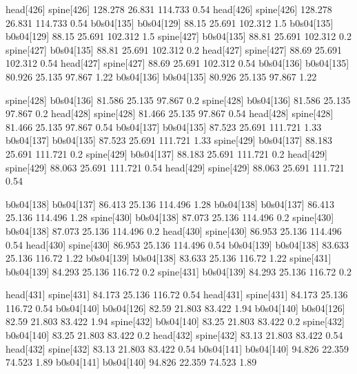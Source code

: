 head[426]    spine[426]    128.278    26.831    114.733    0.54
head[426]    spine[426]    128.278    26.831    114.733    0.54
b0s04[135]    b0s04[129]    88.15    25.691    102.312    1.5
b0s04[135]    b0s04[129]    88.15    25.691    102.312    1.5
spine[427]    b0s04[135]    88.81    25.691    102.312    0.2
spine[427]    b0s04[135]    88.81    25.691    102.312    0.2
head[427]    spine[427]    88.69    25.691    102.312    0.54
head[427]    spine[427]    88.69    25.691    102.312    0.54
b0s04[136]    b0s04[135]    80.926    25.135    97.867    1.22
b0s04[136]    b0s04[135]    80.926    25.135    97.867    1.22


spine[428]    b0s04[136]    81.586    25.135    97.867    0.2
spine[428]    b0s04[136]    81.586    25.135    97.867    0.2
head[428]    spine[428]    81.466    25.135    97.867    0.54
head[428]    spine[428]    81.466    25.135    97.867    0.54
b0s04[137]    b0s04[135]    87.523    25.691    111.721    1.33
b0s04[137]    b0s04[135]    87.523    25.691    111.721    1.33
spine[429]    b0s04[137]    88.183    25.691    111.721    0.2
spine[429]    b0s04[137]    88.183    25.691    111.721    0.2
head[429]    spine[429]    88.063    25.691    111.721    0.54
head[429]    spine[429]    88.063    25.691    111.721    0.54


b0s04[138]    b0s04[137]    86.413    25.136    114.496    1.28
b0s04[138]    b0s04[137]    86.413    25.136    114.496    1.28
spine[430]    b0s04[138]    87.073    25.136    114.496    0.2
spine[430]    b0s04[138]    87.073    25.136    114.496    0.2
head[430]    spine[430]    86.953    25.136    114.496    0.54
head[430]    spine[430]    86.953    25.136    114.496    0.54
b0s04[139]    b0s04[138]    83.633    25.136    116.72    1.22
b0s04[139]    b0s04[138]    83.633    25.136    116.72    1.22
spine[431]    b0s04[139]    84.293    25.136    116.72    0.2
spine[431]    b0s04[139]    84.293    25.136    116.72    0.2


head[431]    spine[431]    84.173    25.136    116.72    0.54
head[431]    spine[431]    84.173    25.136    116.72    0.54
b0s04[140]    b0s04[126]    82.59    21.803    83.422    1.94
b0s04[140]    b0s04[126]    82.59    21.803    83.422    1.94
spine[432]    b0s04[140]    83.25    21.803    83.422    0.2
spine[432]    b0s04[140]    83.25    21.803    83.422    0.2
head[432]    spine[432]    83.13    21.803    83.422    0.54
head[432]    spine[432]    83.13    21.803    83.422    0.54
b0s04[141]    b0s04[140]    94.826    22.359    74.523    1.89
b0s04[141]    b0s04[140]    94.826    22.359    74.523    1.89


